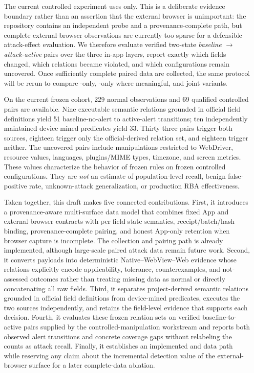 The current controlled experiment uses \appfp only. This is a deliberate evidence boundary rather than an assertion that the external browser is unimportant: the repository contains an independent \browserfp probe and a provenance-complete \pairedfp path, but complete external-browser observations are currently too sparse for a defensible attack-effect evaluation. We therefore evaluate verified two-state \emph{baseline $\rightarrow$ attack-active} pairs over the three in-app layers, report exactly which fields changed, which relations became violated, and which configurations remain uncovered. Once sufficiently complete paired data are collected, the same protocol will be rerun to compare \appfp-only, \browserfp-only where meaningful, and joint \pairedfp variants.

On the current frozen cohort, 229 normal observations and 69 qualified controlled pairs are available. Nine executable semantic relations grounded in official field definitions yield 51 baseline-no-alert to active-alert transitions; ten independently maintained device-mined predicates yield 33. Thirty-three pairs trigger both sources, eighteen trigger only the official-derived relation set, and eighteen trigger neither. The uncovered pairs include manipulations restricted to WebDriver, resource values, languages, plugins/MIME types, timezone, and screen metrics. These values characterize the behavior of frozen rules on frozen controlled configurations. They are \emph{not} an estimate of population-level recall, benign false-positive rate, unknown-attack generalization, or production RBA effectiveness.

Taken together, this draft makes five connected contributions. First, it introduces a provenance-aware multi-surface data model that combines fixed App and external-browser contracts with per-field state semantics, receipt/batch/hash binding, provenance-complete pairing, and honest App-only retention when browser capture is incomplete. The collection and pairing path is already implemented, although large-scale paired attack data remain future work. Second, it converts \appfp payloads into deterministic Native--WebView--Web evidence whose relations explicitly encode applicability, tolerance, counterexamples, and not-assessed outcomes rather than treating missing data as normal or directly concatenating all raw fields. Third, it separates project-derived semantic relations grounded in official field definitions from device-mined predicates, executes the two sources independently, and retains the field-level evidence that supports each decision. Fourth, it evaluates these frozen relation sets on verified baseline-to-active pairs supplied by the controlled-manipulation workstream and reports both observed alert transitions and concrete coverage gaps without relabeling the counts as attack recall. Finally, it establishes an implemented \browserfp and \pairedfp data path while reserving any claim about the incremental detection value of the external-browser surface for a later complete-data ablation.

